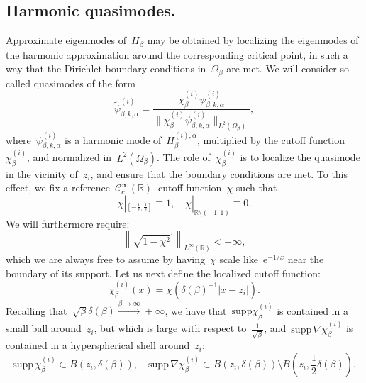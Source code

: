 \documentclass[10pt]{article}
\newcommand{\e}{\mathrm{e}}
\newcommand{\R}{\mathbb{R}}
\newcommand{\1}{\mathbbm 1}
\newcommand{\supp}{\mathrm{supp}}
\newcommand{\largeRadius}{\delta}
\begin{document}
    \subsection{Harmonic quasimodes.}\label{subsec:quasimodes}
    Approximate eigenmodes of~$H_\beta$ may be obtained by localizing the eigenmodes of the harmonic approximation around the corresponding critical point, in such a way that the Dirichlet boundary conditions in~$\Omega_\beta$ are met.
    We will consider so-called quasimodes of the form
    \begin{equation}
        \label{eq:harm_quasimode}
        \widetilde\psi^{(i)}_{\beta,k,\alpha} = \frac{\chi_\beta^{(i)}\psi_{\beta,k,\alpha}^{(i)}}{\|\chi_\beta^{(i)}\psi_{\beta,k,\alpha}^{(i)}\|_{L^2(\Omega_\beta)}},
    \end{equation}
    where~$\psi_{\beta,k,\alpha}^{(i)}$ is a harmonic mode of~$H_\beta^{(i),\alpha}$, multiplied by the cutoff function~$\chi_\beta^{(i)}$, and normalized in~$L^2(\Omega_\beta)$.
    The role of~$\chi_\beta^{(i)}$ is to localize the quasimode in the vicinity of~$z_i$, and ensure that the boundary conditions are met. To this effect, we fix a reference~$\mathcal C_c^\infty(\R)~$ cutoff function~$\chi$ such that
    \[\chi|_{\left[-\frac12,\frac12\right]}\equiv 1,\quad \chi|_{\R\setminus (-1,1)} \equiv 0.\]
    We will furthermore require:
    \begin{equation}
        \label{eq:partition_of_unity_condition}
        \left\|\sqrt{1-\chi^2}^\prime\right\|_{L^\infty(\R)} < +\infty,
    \end{equation}
    which we are always free to assume by having~$\chi$ scale like~$\e^{-1/x}$ near the boundary of its support.
    Let us next define the localized cutoff function:
    \begin{equation}
        \label{eq:cutoff}
        \chi_\beta^{(i)}(x) = \chi\left(\largeRadius(\beta)^{-1}|x-z_i|\right).
    \end{equation}
    Recalling that~$\sqrt\beta\largeRadius(\beta)\xrightarrow{\beta\to\infty} + \infty$, we have that~$\supp \chi_\beta^{(i)}$ is contained in a small ball around~$z_i$, but which is large with respect to~$\frac1{\sqrt\beta}$, and~$\supp\,\nabla \chi_\beta^{(i)}$ is contained in a hyperspherical shell around~$z_i$:
    \begin{equation}
        \label{eq:cutoff_supports}
        \supp\,\chi_\beta^{(i)} \subset B(z_i,\largeRadius(\beta)),\quad\supp\,\nabla\chi_\beta^{(i)} \subset B(z_i,\largeRadius(\beta))\setminus B\left(z_i,\frac12\largeRadius(\beta)\right).
    \end{equation}
\end{document}
